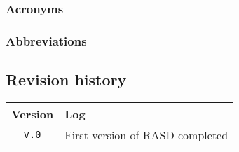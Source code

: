 \begin{description}
      \end{description}

    \subsubsection{Acronyms}

      \begin{description}
        \item[] %
      \end{description}

    \subsubsection{Abbreviations}

      \begin{description}
        \item[] %
      \end{description}

  \subsection{Revision history}

  \label{sec:revhistory}
    \begin{table}[!h]
      \begin{tabular}{|c|l|}
        \hline
        \textbf{Version}                & \textbf{Log} \\ \hline
        \texttt{v.0} &
          First version of RASD completed
        \\ \hline
      \end{tabular}
    \end{table}

